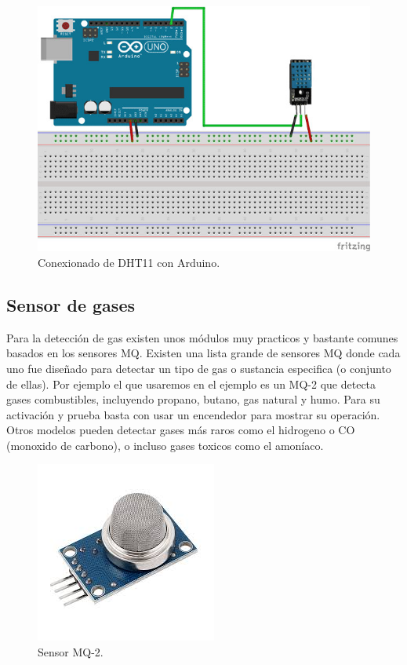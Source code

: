 \begin{figure}[H]
  \begin{center}
    \includegraphics[scale=0.6]{imagenes/dth11_conexionado.jpg}
  \end{center}
  \caption{Conexionado de DHT11 con Arduino.}
  \label{figura:sensor_dth11_bits}
\end{figure}

\subsection{Sensor de gases}


Para la detección de gas existen unos módulos muy practicos y bastante comunes basados en los sensores MQ. Existen una lista grande de sensores MQ donde cada uno fue diseñado para
detectar un tipo de gas o sustancia especifica (o conjunto de ellas). Por ejemplo el que usaremos en el ejemplo es un MQ-2 que detecta gases combustibles, incluyendo propano, 
butano, gas natural y humo. Para su activación y prueba basta con usar un encendedor para mostrar su operación. Otros modelos pueden detectar gases más raros como el hidrogeno o CO 
(monoxido de carbono), o incluso gases toxicos como el amoníaco.\\

\begin{figure}[H]
  \begin{center}
    \includegraphics[scale=0.6]{imagenes/mq2_sensor.jpeg}
  \end{center}
  \caption{Sensor MQ-2.}
  \label{figura:sensor_mq_2}
\end{figure}

